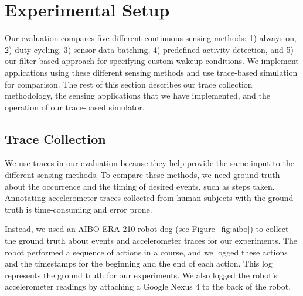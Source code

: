 \section{Experimental Setup}
\label{sec:experimentalSetup}

Our evaluation compares five different continuous sensing methods: 1) always on,
2) duty cycling, 3) sensor data batching, 4) predefined activity detection, and
5) our filter-based approach for specifying custom wakeup conditions. We
implement applications using these different sensing methods and use trace-based
simulation for comparison. The rest of this section describes our trace
collection methodology, the sensing applications that we have implemented, and
the operation of our trace-based simulator.


\subsection{Trace Collection}

We use traces in our evaluation because they help provide the same
input to the different sensing methods. To compare these methods, we
need ground truth about the occurrence and the timing of desired
events, such as steps taken. Annotating accelerometer traces collected
from human subjects with the ground truth is time-consuming and error
prone.

Instead, we used an AIBO ERA 210 robot dog (see Figure~\ref{fig:aibo})
to collect the ground truth about events and accelerometer traces for
our experiments. The robot performed a sequence of actions in a
course, and we logged these actions and the timestamps for the
beginning and the end of each action. This log represents the ground
truth for our experiments. We also logged the robot's accelerometer
readings by attaching a Google Nexus 4 to the back of the robot.

